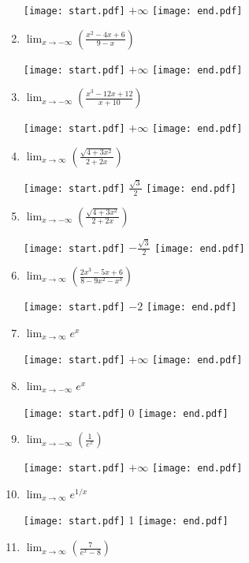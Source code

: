 \documentclass[12pt]{article}
\begin{document}
\begin{enumerate}
\texttt{[image: start.pdf]}
{{$+\infty$}}
\texttt{[image: end.pdf]}


\item  $\displaystyle \lim_{x\rightarrow -\infty}{\left(\frac{x^2-4x+6}{9-x}\right)}$

\texttt{[image: start.pdf]}
{{$+\infty$}}
\texttt{[image: end.pdf]}


\item  $\displaystyle \lim_{x\rightarrow -\infty}{\left(\frac{x^3-12x+12}{x+10}\right)}$

\texttt{[image: start.pdf]}
{{$+\infty$}}
\texttt{[image: end.pdf]}


\item $\displaystyle \lim_{x \rightarrow \infty}{\left(\frac{\sqrt{4+3x^2}}{2+2x}\right)}$

\texttt{[image: start.pdf]}
{{$\displaystyle \frac{\sqrt{3}}{2}$}}
\texttt{[image: end.pdf]}


\item $\displaystyle \lim_{x \rightarrow -\infty}{\left(\frac{\sqrt{4+3x^2}}{2+2x}\right)}$

\texttt{[image: start.pdf]}
{{$\displaystyle -\frac{\sqrt{3}}{2}$}}
\texttt{[image: end.pdf]}


\item $\displaystyle \lim_{x \rightarrow \infty}{\left(\frac{2x^3-5x+6}{8-9x^2-x^3}\right)}$

\texttt{[image: start.pdf]}
{{$-2$}}
\texttt{[image: end.pdf]}


\item  $\displaystyle \lim_{x\rightarrow \infty}{e^{x}}$ 

\texttt{[image: start.pdf]}
{{$+\infty$}}
\texttt{[image: end.pdf]}


\item  $\displaystyle \lim_{x\rightarrow -\infty}{e^x}$ 

\texttt{[image: start.pdf]}
{{0}}
\texttt{[image: end.pdf]}


\item  $\displaystyle \lim_{x\rightarrow -\infty}{\left(\frac{1}{e^x}\right)}$ 

\texttt{[image: start.pdf]}
{{$+\infty$}}
\texttt{[image: end.pdf]}


\item  $\displaystyle \lim_{x\rightarrow \infty} e^{1/x}$ 

\texttt{[image: start.pdf]}
{{1}}
\texttt{[image: end.pdf]}


\item $\displaystyle \lim_{x \rightarrow \infty}{\left(\frac{7}{e^x-8}\right)}$


\end{enumerate}
\end{document}
